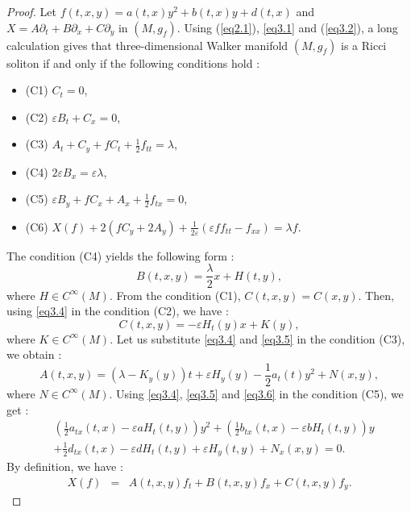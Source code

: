 \documentclass[reqno, 12pt]{amsart}
\numberwithin{equation}{section}
\begin{document}
\begin{proof}
Let $f(t,x,y)=a(t,x) y^{2}+b(t,x) y+d(t,x)$ and 
$X = A\partial_t+ B\partial_x + C \partial_y $ in $(M, g_f)$.  Using (\ref{eq2.1}),  
\eqref{eq3.1} and (\ref{eq3.2}), a long  calculation gives that three-dimensional 
Walker manifold $(M,g_f)$ is a Ricci soliton if and only if the following 
conditions hold :
\begin{itemize}
\item (C1) $C_t= 0$,  
\item (C2) $\varepsilon B_t +C_x= 0$,  
\item (C3) $A_t +C_y +fC_t+\frac{1}{2}f_{tt}=\lambda$,  
\item (C4) $2\varepsilon B_x=\varepsilon\lambda$,  
\item (C5) $\varepsilon B_y +fC_x +A_x+\frac{1}{2}f_{tx}=0$,  
\item (C6) $ X(f) + 2\left( fC_y + 2A_y\right) 
+ \frac{1}{2\varepsilon}\left( \varepsilon ff_{tt}-f_{xx}\right) =\lambda f$. 
\end{itemize}
The condition (C4) yields the following form : 
\begin{equation}\label{eq3.4}
B(t,x,y) =\frac{\lambda}{2}x + H(t,y),
\end{equation}
where	$H \in C^{\infty}(M)$. From the condition (C1), $C(t,x,y)=C(x,y)$. Then, using 
\eqref{eq3.4} in the condition (C2), we have :
\begin{equation}\label{eq3.5}
C(t,x,y)= -\varepsilon H_{t}(y)x+K(y),
\end{equation}  
where $K \in C^{\infty}(M)$. Let us substitute \eqref{eq3.4} and \eqref{eq3.5} 
in the condition (C3), we obtain :
\begin{equation}\label{eq3.6}
A(t,x, y) = \left( \lambda - K_y(y)\right)t + \varepsilon H_{y}(y)
- \frac{1}{2}a_{t}(t)y^2 +N(x,y),
\end{equation}
where $N \in C^{\infty}(M)$. Using \eqref{eq3.4}, \eqref{eq3.5} and \eqref{eq3.6} 
in the condition (C5), we get :
\begin{align*}
&\left( \frac{1}{2}a_{tx}(t,x)	- \varepsilon aH_{t}(t,y)\right) y^{2}
+ \left(  \frac{1}{2}b_{tx}(t,x) - \varepsilon bH_{t}(t,y)\right) y\nonumber\\
& + \frac{1}{2}d_{tx}(t,x)-\varepsilon dH_{t}(t,y)+\varepsilon H_{y}(t,y) + N_{x}(x,y)=0.
\end{align*}
By definition, we have :
\begin{eqnarray*}
X(f) &=& A(t,x,y) f_t + B(t,x,y) f_x + C(t,x,y) f_y.
\end{eqnarray*}

\end{proof}
\end{document}
